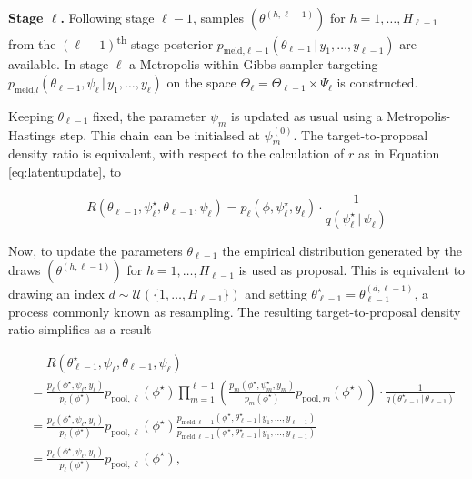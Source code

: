 \documentclass[11pt,]{book}
\begin{document}
\textbf{Stage \(\ell\).} Following stage \(\ell-1\), samples
\((\theta^{(h, \ell-1)})\) for \(h = 1, \ldots, H_{\ell-1}\) from the
\((\ell-1)\)\textsuperscript{th} stage posterior
\(p_{\text {meld,}\ell-1}(\theta_{\ell-1} \, | \, y_{1}, \ldots, y_{\ell-1})\)
are available. In stage \(\ell\) a Metropolis-within-Gibbs sampler
targeting
\(p_{\text{meld,}l}(\theta_{\ell-1}, \psi_\ell \, | \, y_1, \ldots, y_\ell)\)
on the space \(\Theta_\ell = \Theta_{\ell - 1} \times \Psi_\ell\) is
constructed.

Keeping \(\theta_{\ell - 1}\) fixed, the parameter \(\psi_m\) is updated
as usual using a Metropolis-Hastings step. This chain can be initialsed
at \(\psi_m^{(0)}\). The target-to-proposal density ratio is equivalent,
with respect to the calculation of \(r\) as in Equation
\eqref{eq:latentupdate}, to

\begin{equation}
R(\theta_{\ell - 1}, \psi_\ell^\star, \theta_{\ell - 1}, \psi_\ell) = p_\ell(\phi, \psi_\ell^\star, y_\ell) \cdot \frac{1}{q(\psi_\ell^\star \, | \, \psi_\ell)}
\end{equation}

Now, to update the parameters \(\theta_{\ell - 1}\) the empirical
distribution generated by the draws \((\theta^{(h, \ell-1)})\) for
\(h = 1, \ldots, H_{\ell-1}\) is used as proposal. This is equivalent to
drawing an index \(d \sim \mathcal{U}(\{1, \ldots, H_{\ell-1}\})\) and
setting \(\theta_{\ell - 1}^\star = \theta_{\ell - 1}^{(d, \ell - 1)}\),
a process commonly known as resampling. The resulting target-to-proposal
density ratio simplifies as a result

\begin{align}
&\phantom{=} R(\theta_{\ell - 1}^\star, \psi_\ell, \theta_{\ell - 1}, \psi_\ell) \nonumber \\
&= \frac{p_\ell(\phi^\star, \psi_\ell, y_\ell)}{p_\ell(\phi^\star)} p_{\mathrm{pool}, \ell}(\phi^\star) \prod_{m=1}^{\ell - 1} \left(\frac{p_m(\phi^\star, \psi_m^\star, y_m)}{p_m(\phi^\star)} p_{\mathrm{pool}, m}(\phi^\star)\right) \cdot \frac{1}{q(\theta_{\ell - 1}^\star \, | \, \theta_{\ell - 1})} \nonumber \\
&= \frac{p_\ell(\phi^\star, \psi_\ell, y_\ell)}{p_\ell(\phi^\star)} p_{\mathrm{pool}, \ell}(\phi^\star) \frac{p_{\text{meld,}\ell - 1}(\phi^\star, \theta_{\ell - 1}^\star \, | \, y_1, \ldots, y_{\ell - 1})}{p_{\text{meld,}\ell - 1}(\phi^\star, \theta_{\ell - 1}^\star \, | \, y_1, \ldots, y_{\ell - 1})} \nonumber \\
&= \frac{p_\ell(\phi^\star, \psi_\ell, y_\ell)}{p_\ell(\phi^\star)} p_{\mathrm{pool}, \ell}(\phi^\star),
\end{align}
\end{document}
